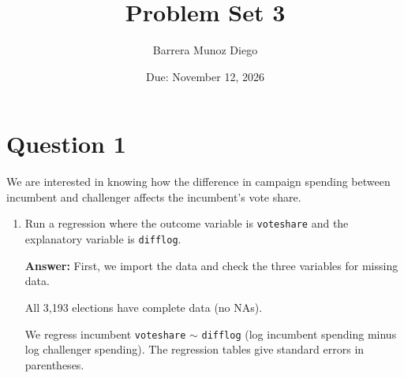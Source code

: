 \documentclass[12pt,letterpaper]{article}
\title{Problem Set 3}
\author{Barrera Munoz Diego}
\date{Due: November 12, 2026}
\newcommand{\rcode}[2]{}
\newcommand{\answer}{\par\vspace{.18cm}\noindent\textbf{Answer:} }
\begin{document}
\setlength{\abovedisplayskip}{7pt plus 2pt minus 1pt}
\setlength{\belowdisplayskip}{7pt plus 2pt minus 1pt}
\maketitle
\tableofcontents

\newpage

\section{Question 1}
\noindent We are interested in knowing how the difference in campaign spending between incumbent and challenger affects the incumbent's vote share.

\begin{enumerate}[(1)]
\setlength{\itemsep}{4pt}\setlength{\parsep}{2pt}
\item Run a regression where the outcome variable is \texttt{voteshare} and the explanatory variable is \texttt{difflog}.

\answer First, we import the data and check the three variables for missing data.

\rcode{12}{19}

\par\nobreak
{\footnotesize\setlength{\tabcolsep}{4pt}\renewcommand{\arraystretch}{0.93}%
\noindent{}\par}
\smallskip


All 3,193 elections have complete data (no NAs).

We regress incumbent \texttt{voteshare} $\sim$ \texttt{difflog} (log incumbent spending minus log challenger spending). The regression tables give standard errors in parentheses.


\end{enumerate}
\end{document}
